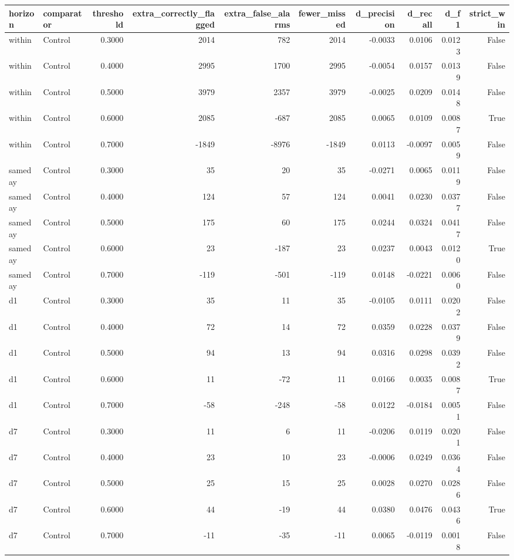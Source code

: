 \begin{tabular}{llrrrrrrrr}
\toprule
horizon & comparator & threshold & extra\_correctly\_flagged & extra\_false\_alarms & fewer\_missed & d\_precision & d\_recall & d\_f1 & strict\_win \\
\midrule
within & Control & 0.3000 & 2014 & 782 & 2014 & -0.0033 & 0.0106 & 0.0123 & False \\
within & Control & 0.4000 & 2995 & 1700 & 2995 & -0.0054 & 0.0157 & 0.0139 & False \\
within & Control & 0.5000 & 3979 & 2357 & 3979 & -0.0025 & 0.0209 & 0.0148 & False \\
within & Control & 0.6000 & 2085 & -687 & 2085 & 0.0065 & 0.0109 & 0.0087 & True \\
within & Control & 0.7000 & -1849 & -8976 & -1849 & 0.0113 & -0.0097 & 0.0059 & False \\
sameday & Control & 0.3000 & 35 & 20 & 35 & -0.0271 & 0.0065 & 0.0119 & False \\
sameday & Control & 0.4000 & 124 & 57 & 124 & 0.0041 & 0.0230 & 0.0377 & False \\
sameday & Control & 0.5000 & 175 & 60 & 175 & 0.0244 & 0.0324 & 0.0417 & False \\
sameday & Control & 0.6000 & 23 & -187 & 23 & 0.0237 & 0.0043 & 0.0120 & True \\
sameday & Control & 0.7000 & -119 & -501 & -119 & 0.0148 & -0.0221 & 0.0060 & False \\
d1 & Control & 0.3000 & 35 & 11 & 35 & -0.0105 & 0.0111 & 0.0202 & False \\
d1 & Control & 0.4000 & 72 & 14 & 72 & 0.0359 & 0.0228 & 0.0379 & False \\
d1 & Control & 0.5000 & 94 & 13 & 94 & 0.0316 & 0.0298 & 0.0392 & False \\
d1 & Control & 0.6000 & 11 & -72 & 11 & 0.0166 & 0.0035 & 0.0087 & True \\
d1 & Control & 0.7000 & -58 & -248 & -58 & 0.0122 & -0.0184 & 0.0051 & False \\
d7 & Control & 0.3000 & 11 & 6 & 11 & -0.0206 & 0.0119 & 0.0201 & False \\
d7 & Control & 0.4000 & 23 & 10 & 23 & -0.0006 & 0.0249 & 0.0364 & False \\
d7 & Control & 0.5000 & 25 & 15 & 25 & 0.0028 & 0.0270 & 0.0286 & False \\
d7 & Control & 0.6000 & 44 & -19 & 44 & 0.0380 & 0.0476 & 0.0436 & True \\
d7 & Control & 0.7000 & -11 & -35 & -11 & 0.0065 & -0.0119 & 0.0018 & False \\

\end{tabular}
